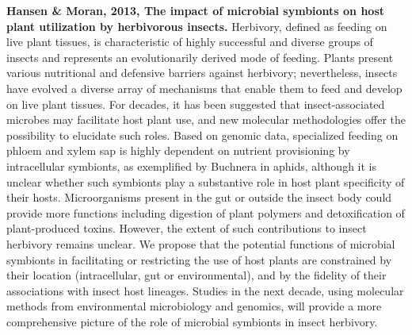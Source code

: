 \documentclass[11pt]{article}
\begin{document}
\begin{sloppypar}
\par

\textbf{Hansen & Moran, 2013, The impact of microbial symbionts on host plant utilization by herbivorous insects.} \newline
Herbivory, defined as feeding on live plant tissues, is characteristic of highly successful and diverse groups of insects and represents an evolutionarily derived mode of feeding. Plants present various nutritional and defensive barriers against herbivory; nevertheless, insects have evolved a diverse array of mechanisms that enable them to feed and develop on live plant tissues. For decades, it has been suggested that insect-associated microbes may facilitate host plant use, and new molecular methodologies offer the possibility to elucidate such roles. Based on genomic data, specialized feeding on phloem and xylem sap is highly dependent on nutrient provisioning by intracellular symbionts, as exemplified by Buchnera in aphids, although it is unclear whether such symbionts play a substantive role in host plant specificity of their hosts. Microorganisms present in the gut or outside the insect body could provide more functions including digestion of plant polymers and detoxification of plant-produced toxins. However, the extent of such contributions to insect herbivory remains unclear. We propose that the potential functions of microbial symbionts in facilitating or restricting the use of host plants are constrained by their location (intracellular, gut or environmental), and by the fidelity of their associations with insect host lineages. Studies in the next decade, using molecular methods from environmental microbiology and genomics, will provide a more comprehensive picture of the role of microbial symbionts in insect herbivory.

\par


\end{sloppypar}
\end{document}
